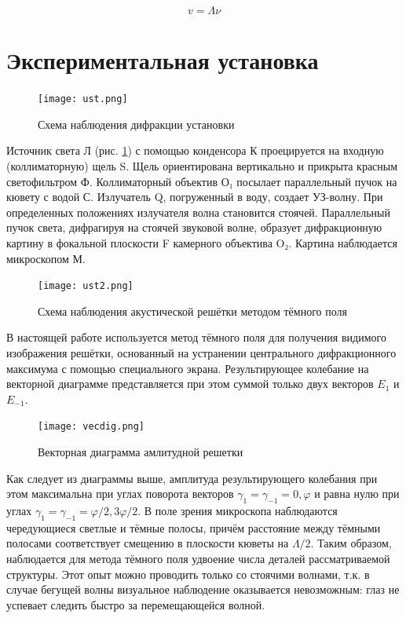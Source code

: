 \documentclass[a4paper,12pt]{article} %
\renewcommand{\phi}{\ensuremath{\varphi}} %
\theoremstyle{plain} %
\theoremstyle{definition} %
\theoremstyle{remark} %
\renewcommand{\phi}{\ensuremath{\varphi}}
\begin{document}
\begin{equation}
	v = \Lambda \nu 
\end{equation}
			
\newpage

\section{Экспериментальная установка}

\begin{figure}[H]
	\centering
	\texttt{[image: ust.png]}
	\caption{Схема наблюдения дифракции установки}
	\label{ust1}
\end{figure}

Источник света Л (рис. \ref{ust1}) с помощью конденсора К проецируется на входную (коллиматорную) щель S. Щель ориентирована вертикально и прикрыта красным светофильтром Ф. Коллиматорный объектив О₁ посылает параллельный пучок на кювету с водой С. Излучатель Q, погруженный в воду, создает УЗ-волну. При определенных положениях излучателя волна становится стоячей. 
Параллельный пучок света, дифрагируя на стоячей звуковой волне, образует дифракционную картину в фокальной плоскости F камерного объектива O₂. Картина наблюдается микроскопом М.

\begin{figure}[H]
	\centering
	\texttt{[image: ust2.png]}
	\caption{Схема наблюдения акустической решётки методом тёмного поля}
	\label{ust2}
\end{figure}

В настоящей работе используется метод тёмного поля для получения видимого изображения решётки, основанный на устранении центрального дифракционного максимума с помощью специального экрана. Результирующее колебание на векторной диаграмме представляется при этом суммой только двух векторов $E_1$ и $E_{-1}$. 

\begin{figure}[H]
	\centering
	\texttt{[image: vecdig.png]}
	\caption{Векторная диаграмма амлитудной решетки}
	\label{vecdig}
\end{figure}

Как следует из диаграммы выше, амплитуда результирующего колебания при этом максимальна при углах поворота векторов $\gamma_1=\gamma_{-1}=0,\phi$ и равна нулю при углах $\gamma_1=\gamma_{-1}=\phi/2, 3\phi/2$. В поле зрения микроскопа наблюдаются чередующиеся светлые и тёмные полосы, причём расстояние между тёмными полосами соответствует смещению в плоскости кюветы на $\Lambda/2$. Таким образом, наблюдается для метода тёмного поля удвоение числа деталей рассматриваемой структуры.
Этот опыт можно проводить только со стоячими волнами, т.к. в случае бегущей волны визуальное наблюдение оказывается невозможным: глаз не успевает следить быстро за перемещающейся волной.
\end{document}
